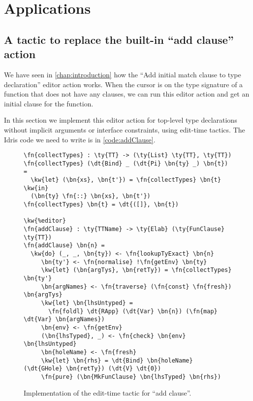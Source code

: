 \section{Applications} \label{chap:applications}

\subsection{A tactic to replace the built-in ``add clause'' action}\label{sec:addClause}

We have seen in \autoref{chap:introduction} how the ``Add initial match clause
to type declaration'' editor action works. When the cursor is on the type
signature of a function that does not have any clauses, we can run this editor
action and get an initial clause for the function.

In this section we implement this editor action for top-level type declarations
without implicit arguments or interface constraints, using edit-time tactics.
The Idris code we need to write is in \autoref{code:addClause}.

\begin{figure}[ht]
\caption{Implementation of the edit-time tactic for ``add clause''.}
\label{code:addClause}
\begin{Verbatim}[framesep=2mm, label=\footnotesize{\normalfont{Idris}}, labelposition=topline]
\fn{collectTypes} : \ty{TT} -> (\ty{List} \ty{TT}, \ty{TT})
\fn{collectTypes} (\dt{Bind} _ (\dt{Pi} \bn{ty} _) \bn{t}) =
  \kw{let} (\bn{xs}, \bn{t'}) = \fn{collectTypes} \bn{t} \kw{in}
  (\bn{ty} \fn{::} \bn{xs}, \bn{t'})
\fn{collectTypes} \bn{t} = \dt{([]}, \bn{t})

\kw{%editor}
\fn{addClause} : \ty{TTName} -> \ty{Elab} (\ty{FunClause} \ty{TT})
\fn{addClause} \bn{n} =
  \kw{do} (_, _, \bn{ty}) <- \fn{lookupTyExact} \bn{n}
     \bn{ty'} <- \fn{normalise} !\fn{getEnv} \bn{ty}
     \kw{let} (\bn{argTys}, \bn{retTy}) = \fn{collectTypes} \bn{ty'}
     \bn{argNames} <- \fn{traverse} (\fn{const} \fn{fresh}) \bn{argTys}
     \kw{let} \bn{lhsUntyped} =
       \fn{foldl} \dt{RApp} (\dt{Var} \bn{n}) (\fn{map} \dt{Var} \bn{argNames})
     \bn{env} <- \fn{getEnv}
     (\bn{lhsTyped}, _) <- \fn{check} \bn{env} \bn{lhsUntyped}
     \bn{holeName} <- \fn{fresh}
     \kw{let} \bn{rhs} = \dt{Bind} \bn{holeName} (\dt{GHole} \bn{retTy}) (\dt{V} \dt{0})
     \fn{pure} (\bn{MkFunClause} \bn{lhsTyped} \bn{rhs})
\end{Verbatim}
\end{figure}

